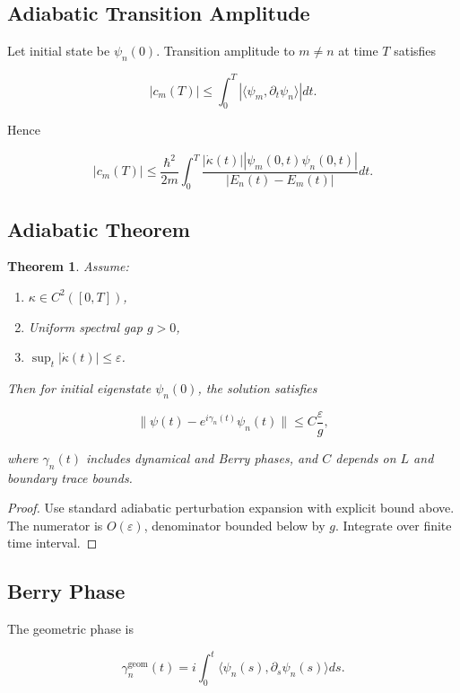 \documentclass[11pt,a4paper]{article}
\newtheorem{theorem}{Theorem}[section]
\begin{document}
\subsection{Adiabatic Transition Amplitude}

Let initial state be $\psi_n(0)$.
Transition amplitude to $m\neq n$ at time $T$ satisfies

\[
|c_m(T)|
\le
\int_0^T
\left|
\langle \psi_m,\partial_t\psi_n\rangle
\right|
dt.
\]

Hence

\[
|c_m(T)|
\le
\frac{\hbar^2}{2m}
\int_0^T
\frac{
|\dot\kappa(t)|
|\psi_m(0,t)\psi_n(0,t)|
}{
|E_n(t)-E_m(t)|
}
dt.
\]

\subsection{Adiabatic Theorem}

\begin{theorem}
Assume:

\begin{enumerate}
\item $\kappa \in C^2([0,T])$,
\item Uniform spectral gap $g>0$,
\item $\sup_t |\dot\kappa(t)| \le \varepsilon$.
\end{enumerate}

Then for initial eigenstate $\psi_n(0)$,
the solution satisfies

\[
\|\psi(t) - e^{i\gamma_n(t)}\psi_n(t)\|
\le
C \frac{\varepsilon}{g},
\]

where $\gamma_n(t)$ includes dynamical and Berry phases,
and $C$ depends on $L$ and boundary trace bounds.
\end{theorem}

\begin{proof}
Use standard adiabatic perturbation expansion
with explicit bound above.
The numerator is $O(\varepsilon)$,
denominator bounded below by $g$.
Integrate over finite time interval.
\end{proof}

\subsection{Berry Phase}

The geometric phase is

\[
\gamma_n^{\text{geom}}(t)
=
i\int_0^t
\langle \psi_n(s),\partial_s\psi_n(s)\rangle ds.
\]
\end{document}
